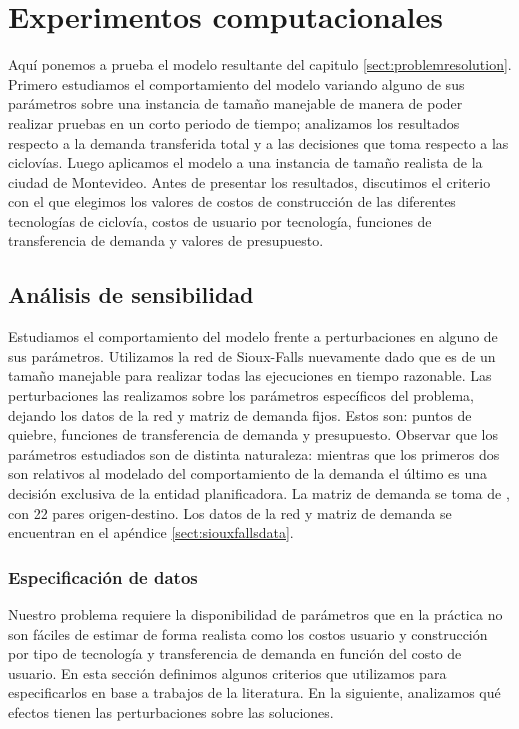 \documentclass{article}
\begin{document}
  \section{Experimentos computacionales}
  \label{sect:problemresults}

  Aquí ponemos a prueba el modelo resultante del capitulo \ref{sect:problemresolution}. Primero estudiamos el comportamiento del modelo variando alguno de sus parámetros sobre una instancia de tamaño manejable de manera de poder realizar pruebas en un corto periodo de tiempo; analizamos los resultados respecto a la demanda transferida total y a las decisiones que toma respecto a las ciclovías. Luego aplicamos el modelo a una instancia de tamaño realista de la ciudad de Montevideo. Antes de presentar los resultados, discutimos el criterio con el que elegimos los valores de costos de construcción de las diferentes tecnologías de ciclovía, costos de usuario por tecnología, funciones de transferencia de demanda y valores de presupuesto.

  \subsection{Análisis de sensibilidad}

  Estudiamos el comportamiento del modelo frente a perturbaciones en alguno de sus parámetros. Utilizamos la red de Sioux-Falls nuevamente dado que es de un tamaño manejable para realizar todas las ejecuciones en tiempo razonable. Las perturbaciones las realizamos sobre los parámetros específicos del problema, dejando los datos de la red y matriz de demanda fijos. Estos son: puntos de quiebre, funciones de transferencia de demanda y presupuesto. Observar que los parámetros estudiados son de distinta naturaleza: mientras que los primeros dos son relativos al modelado del comportamiento de la demanda el último es una decisión exclusiva de la entidad planificadora. La matriz de demanda se toma de \cite{liu2019}, con 22 pares origen-destino. Los datos de la red y matriz de demanda se encuentran en el apéndice \ref{sect:siouxfallsdata}.

  \subsubsection{Especificación de datos}
  \label{sect:dataspecification}

  Nuestro problema requiere la disponibilidad de parámetros que en la práctica no son fáciles de estimar de forma realista como los costos usuario y construcción por tipo de tecnología y transferencia de demanda en función del costo de usuario. En esta sección definimos algunos criterios que utilizamos para especificarlos en base a trabajos de la literatura. En la siguiente, analizamos qué efectos tienen las perturbaciones sobre las soluciones.
\end{document}
